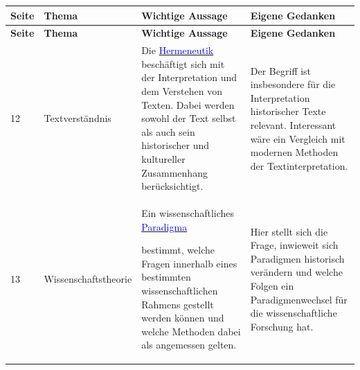 \documentclass[11pt,a4paper]{article}
\newcommand{\gls}[1]{%
    \hyperlink{glossar:#1}{\textcolor{blue}{#1}}%
}
\begin{document}
\begin{longtable}{@{}p{2cm}p{4.5cm}p{9.5cm}p{9.5cm}@{}}


\toprule

\rowcolor{headerblue}

\color{white}\textbf{Seite}
&
\color{white}\textbf{Thema}
&
\color{white}\textbf{Wichtige Aussage}
&
\color{white}\textbf{Eigene Gedanken}

\\

\midrule

\endfirsthead


\toprule

\rowcolor{headerblue}

\color{white}\textbf{Seite}
&
\color{white}\textbf{Thema}
&
\color{white}\textbf{Wichtige Aussage}
&
\color{white}\textbf{Eigene Gedanken}
\\

\midrule

\endhead


\bottomrule

\endfoot


12
&
Textverständnis
&
Die \gls{Hermeneutik} beschäftigt sich mit
der Interpretation und dem Verstehen von Texten.
Dabei werden sowohl der Text selbst als auch
sein historischer und kultureller Zusammenhang
berücksichtigt.
&
Der Begriff ist insbesondere für die Interpretation
historischer Texte relevant. Interessant wäre ein
Vergleich mit modernen Methoden der
Textinterpretation.

\\[2.5cm]

13
&
Wissenschaftstheorie
&
Ein wissenschaftliches \gls{Paradigma}
bestimmt, welche Fragen innerhalb eines
bestimmten wissenschaftlichen Rahmens gestellt
werden können und welche Methoden dabei
als angemessen gelten.
&
Hier stellt sich die Frage, inwieweit sich
Paradigmen historisch verändern und welche
Folgen ein Paradigmenwechsel für die
wissenschaftliche Forschung hat.


\end{longtable}
\end{document}
